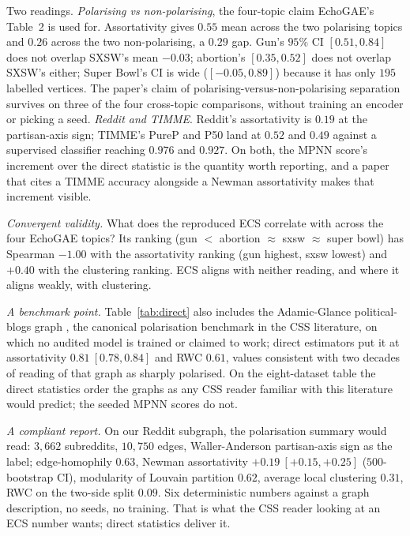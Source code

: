 \documentclass[letterpaper]{article} %
\begin{document}
Two readings.
\emph{Polarising vs non-polarising}, the four-topic claim
EchoGAE's Table~2 is used for. Assortativity gives $0.55$ mean
across the two polarising topics and $0.26$ across the two
non-polarising, a $0.29$ gap. Gun's $95\%$ CI $[0.51, 0.84]$
does not overlap SXSW's mean $-0.03$; abortion's $[0.35, 0.52]$
does not overlap SXSW's either; Super Bowl's CI is wide
($[-0.05, 0.89]$) because it has only $195$ labelled
vertices. The paper's claim of polarising-versus-non-polarising
separation survives on three of the four cross-topic
comparisons, without training an encoder or picking a seed.
\emph{Reddit and TIMME}. Reddit's assortativity is $0.19$ at
the partisan-axis sign; TIMME's PureP and P50 land at $0.52$
and $0.49$ against a supervised classifier reaching $0.976$ and
$0.927$. On both, the MPNN score's increment over the direct
statistic is the quantity worth reporting, and a paper that
cites a TIMME accuracy alongside a Newman assortativity makes
that increment visible.

\emph{Convergent validity.} What does the reproduced ECS
correlate with across the four EchoGAE topics? Its ranking
(gun $<$ abortion $\approx$ sxsw $\approx$ super bowl) has
Spearman $-1.00$ with the assortativity ranking (gun highest,
sxsw lowest) and $+0.40$ with the clustering ranking. ECS
aligns with neither reading, and where it aligns weakly, with
clustering.

\emph{A benchmark point.} Table~\ref{tab:direct} also
includes the Adamic-Glance political-blogs graph
\citep{AdamicGlance2005}, the canonical polarisation benchmark
in the CSS literature, on which no audited model is
trained or claimed to work; direct estimators put it at
assortativity $0.81\ [0.78, 0.84]$ and RWC $0.61$, values
consistent with two decades of reading of that graph as
sharply polarised. On the eight-dataset table the direct
statistics order the graphs as any CSS reader familiar with
this literature would predict; the seeded MPNN scores do not.

\emph{A compliant report.} On our Reddit subgraph, the
polarisation summary would read: $3{,}662$ subreddits,
$10{,}750$ edges, Waller-Anderson partisan-axis sign as the
label; edge-homophily $0.63$, Newman assortativity
$+0.19\ [+0.15, +0.25]$ ($500$-bootstrap CI), modularity of
Louvain partition $0.62$, average local clustering $0.31$,
RWC on the two-side split $0.09$. Six deterministic numbers
against a graph description, no seeds, no training. That is
what the CSS reader looking at an ECS number wants; direct
statistics deliver it.
\end{document}
